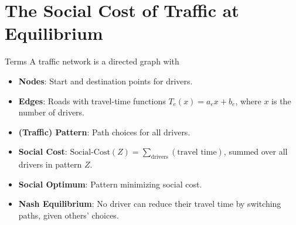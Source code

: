 \documentclass[10pt]{beamer}
\begin{document}
\section{The Social Cost of Traffic at Equilibrium}

\begin{frame}{Terms}
A traffic network is a directed graph with
\onslide<+->
\begin{itemize}[<+->]
    \item \textbf{Nodes}: Start and destination points for drivers.
    \item \textbf{Edges}: Roads with travel-time functions \( T_e(x) = a_e x + b_e \), where \( x \) is the number of drivers.
    \item \textbf{(Traffic) Pattern}: Path choices for all drivers.
    \item \textbf{Social Cost}: \( \text{Social-Cost}(Z) = \sum_{\text{drivers}} (\text{travel time}) \), summed over all drivers in pattern \( Z \).
    \item \textbf{Social Optimum}: Pattern minimizing social cost.
    \item \textbf{Nash Equilibrium}: No driver can reduce their travel time by switching paths, given others' choices.
\end{itemize}
\end{frame}
\end{document}
